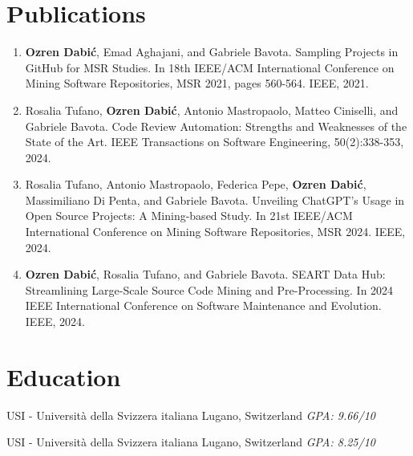 \documentclass[12pt,a4paper,sans]{moderncv}
\begin{document}

\section{Publications}

\begin{enumerate}
    \item \textbf{Ozren Dabić}, Emad Aghajani, and Gabriele Bavota.
    Sampling Projects in GitHub for MSR Studies. In 18th IEEE/ACM International
    Conference on Mining Software Repositories, MSR 2021, pages 560-564. IEEE, 2021.
    \item Rosalia Tufano, \textbf{Ozren Dabić}, Antonio Mastropaolo, Matteo Ciniselli,
    and Gabriele Bavota. Code Review Automation: Strengths and Weaknesses of the State
    of the Art. IEEE Transactions on Software Engineering, 50(2):338-353, 2024.
    \item Rosalia Tufano, Antonio Mastropaolo, Federica Pepe, \textbf{Ozren Dabić},
    Massimiliano Di Penta, and Gabriele Bavota. Unveiling ChatGPT's Usage in Open
    Source Projects: A Mining-based Study. In 21st IEEE/ACM International Conference
    on Mining Software Repositories, MSR 2024. IEEE, 2024.
    \item \textbf{Ozren Dabić}, Rosalia Tufano, and Gabriele Bavota.
    SEART Data Hub: Streamlining Large-Scale Source Code Mining and Pre-Processing.
    In 2024 IEEE International Conference on Software Maintenance and Evolution.
    IEEE, 2024.
\end{enumerate}


\section{Education}

{\newline{}USI - Università della Svizzera italiana}
{Lugano, Switzerland}
{\textit{GPA: 9.66/10}}
{}

{\newline{}USI - Università della Svizzera italiana}
{Lugano, Switzerland}
{\textit{GPA: 8.25/10}}
{}

\end{document}
